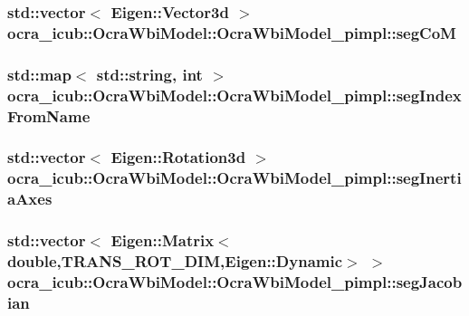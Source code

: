 \hypertarget{structOcraWbiModel_1_1OcraWbiModel__pimpl_af244a33c7309714ca793d29247ead8b8}{
\subsubsection[{seg\-Co\-M}]{\setlength{\rightskip}{0pt plus 5cm}std\-::vector$<$ \-Eigen\-::\-Vector3d $>$ {\bf ocra\-\_\-icub\-::\-Ocra\-Wbi\-Model\-::\-Ocra\-Wbi\-Model\-\_\-pimpl\-::seg\-Co\-M}}}\label{structOcraWbiModel_1_1OcraWbiModel__pimpl_af244a33c7309714ca793d29247ead8b8}
\hypertarget{structOcraWbiModel_1_1OcraWbiModel__pimpl_ad172a7f70ea862fa849e859dc3c8e4f1}{
\subsubsection[{seg\-Index\-From\-Name}]{\setlength{\rightskip}{0pt plus 5cm}std\-::map$<$ std\-::string, int $>$ {\bf ocra\-\_\-icub\-::\-Ocra\-Wbi\-Model\-::\-Ocra\-Wbi\-Model\-\_\-pimpl\-::seg\-Index\-From\-Name}}}\label{structOcraWbiModel_1_1OcraWbiModel__pimpl_ad172a7f70ea862fa849e859dc3c8e4f1}
\hypertarget{structOcraWbiModel_1_1OcraWbiModel__pimpl_aba2d3ed2e0c2a1a1b8b4d40c3df6a4a5}{
\subsubsection[{seg\-Inertia\-Axes}]{\setlength{\rightskip}{0pt plus 5cm}std\-::vector$<$ \-Eigen\-::\-Rotation3d $>$ {\bf ocra\-\_\-icub\-::\-Ocra\-Wbi\-Model\-::\-Ocra\-Wbi\-Model\-\_\-pimpl\-::seg\-Inertia\-Axes}}}\label{structOcraWbiModel_1_1OcraWbiModel__pimpl_aba2d3ed2e0c2a1a1b8b4d40c3df6a4a5}
\hypertarget{structOcraWbiModel_1_1OcraWbiModel__pimpl_a3430097cc1a200a4ff5abcafd52a7d44}{
\subsubsection[{seg\-Jacobian}]{\setlength{\rightskip}{0pt plus 5cm}std\-::vector$<$ \-Eigen\-::\-Matrix$<$double,{\bf \-T\-R\-A\-N\-S\-\_\-\-R\-O\-T\-\_\-\-D\-I\-M},\-Eigen\-::\-Dynamic$>$ $>$ {\bf ocra\-\_\-icub\-::\-Ocra\-Wbi\-Model\-::\-Ocra\-Wbi\-Model\-\_\-pimpl\-::seg\-Jacobian}}}\label{structOcraWbiModel_1_1OcraWbiModel__pimpl_a3430097cc1a200a4ff5abcafd52a7d44}

